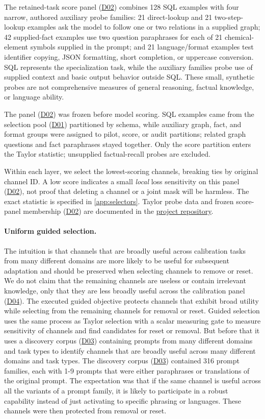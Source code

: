 \documentclass[10pt,letterpaper]{article}
\newcommand{\repositoryurl}{https://github.com/adhasan-dev/remove-or-reset}
\DeclareRobustCommand{\dataset}[1]{\hyperlink{dataset-#1}{\textnormal{#1}}}
\begin{document}
The retained-task score panel (\dataset{D02}) combines 128 SQL examples with four narrow,
authored auxiliary probe families: 21 direct-lookup and 21 two-step-lookup
examples ask the model to follow one or two relations in a supplied graph;
42 supplied-fact examples use two question paraphrases for each of 21
chemical-element symbols supplied in the prompt; and 21 language/format
examples test identifier copying, JSON formatting, short completion, or
uppercase conversion. SQL represents the specialization task, while the
auxiliary families probe use of supplied context and basic output behavior
outside SQL. These small, synthetic probes are not comprehensive measures
of general reasoning, factual knowledge, or language ability.

The panel (\dataset{D02}) was frozen before model scoring. SQL examples came from the
selection pool (\dataset{D01}) partitioned by schema, while auxiliary graph, fact, and
format groups were assigned to pilot, score, or audit partitions; related
graph questions and fact paraphrases stayed together. Only the score partition 
enters the Taylor statistic; unsupplied factual-recall probes are excluded.

Within each layer, we select the lowest-scoring channels, breaking ties by
original channel ID. A low score indicates a small \emph{local} loss
sensitivity on this panel (\dataset{D02}), not proof that deleting a channel or a joint
mask will be harmless. The exact statistic is specified in
\autoref{app:selectors}.
Taylor probe data and frozen score-panel membership (\dataset{D02}) are
documented in the \href{\repositoryurl}{project repository}.

\paragraph{Uniform guided selection.}
The intuition is that channels that are broadly useful across calibration 
tasks from many different domains are more likely to be useful for subsequent adaptation
and should be preserved when selecting channels to remove or reset.
We do not claim that the remaining channels are useless or contain irrelevant knowledge,
only that they are less broadly useful across the calibration panel (\dataset{D04}). The executed guided 
objective protects channels that exhibit broad utility while selecting from the 
remaining channels for removal or reset. Guided selection uses the same process as Taylor 
selection with a scalar measuring gate to measure sensitivity of channels and find candidates 
for reset or removal. But before that it uses a discovery corpus (\dataset{D03}) containing prompts 
from many different domains and task types to identify channels that are broadly 
useful across many different domains and task types.
The discovery corpus (\dataset{D03}) contained 316 prompt families, each with 1-9 prompts that were 
either paraphrases or translations of the original prompt. The expectation 
was that if the same channel is useful across all the variants of a prompt 
family, it is likely to participate in a robust capability instead of just 
activating to specific phrasing or languages. These channels were then 
protected from removal or reset.
\end{document}
